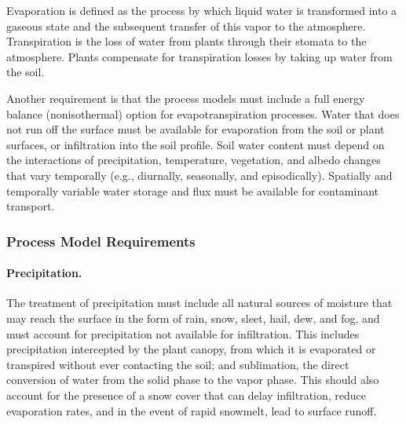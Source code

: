 \noindent 
Evaporation is defined as the process by which liquid water is
transformed into a gaseous state and the subsequent transfer of this
vapor to the atmosphere.  
Transpiration is the loss of water from plants through their stomata to the atmosphere.  
Plants compensate for transpiration losses by taking up water from the soil.

Another requirement is that the process models must include a full energy balance (nonisothermal) option for
evapotranspiration processes.  
Water that does not run off the surface must be available for evaporation from the soil or plant surfaces, 
or infiltration into the soil profile. 
Soil water content must depend on the interactions of precipitation, temperature, vegetation, and albedo changes that vary temporally
(e.g., diurnally, seasonally, and episodically).  
Spatially and temporally variable water storage and flux must be available for contaminant transport.


\subsubsection{Process Model Requirements}

\paragraph{Precipitation. } 
The treatment of precipitation 
must include all natural sources of moisture that may reach the surface 
in the form of rain, snow, sleet, hail, dew, and fog, and must account for precipitation not available for infiltration. 
This includes precipitation intercepted by the plant canopy, from which it is evaporated
or transpired without ever contacting the soil; and sublimation, the direct conversion of water from the solid phase to the vapor phase.  
This should also account for the presence of a snow cover that can delay
infiltration, reduce evaporation rates, and in the event of rapid snowmelt, lead to surface runoff.



